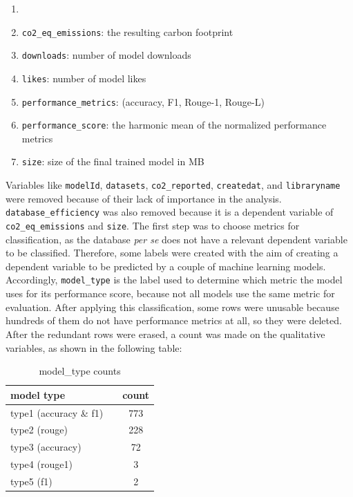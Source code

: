 \documentclass[journal]{IEEEtran}
\begin{document}
	 \begin{enumerate}
	 	\item[]\hspace{-\labelwidth}\hspace{-\labelsep}
	 	\item \texttt{co2\_eq\_emissions}: the resulting carbon footprint
	 	\item \texttt{downloads}: number of model downloads
	 	\item \texttt{likes}: number of model likes
	 	\item \texttt{performance\_metrics}: (accuracy, F1, Rouge-1, Rouge-L)
	 	\item \texttt{performance\_score}: the harmonic mean of the normalized performance metrics
	 	\item \texttt{size}: size of the final trained model in MB
	 \end{enumerate}
	 Variables like \texttt{modelId}, \texttt{datasets}, \texttt{co2\_reported}, \texttt{createdat}, and \texttt{libraryname} were removed because of their lack of importance in the analysis. \texttt{database\_efficiency} was also removed because it is a dependent variable of \texttt{co2\_eq\_emissions} and \texttt{size}.
	 The first step was to choose metrics for classification, as the database \textit{per se} does not have a relevant dependent variable to be classified. Therefore, some labels were created with the aim of creating a dependent variable to be predicted by a couple of machine learning models. Accordingly, \texttt{model\_type} is the label used to determine which metric the model uses for its performance score, because not all models use the same metric for evaluation. After applying this classification, some rows were unusable because hundreds of them do not have performance metrics at all, so they were deleted.
	 After the redundant rows were erased, a count was made on the qualitative variables, as shown in the following table:



	 \begin{table}[H]
	 	\centering
	 	\caption{model\_type counts}
	 	\begin{tabular}{l c }
	 		\toprule
	 		model type & count \\
	 		\midrule
	 		type1 (accuracy \& f1)  & 773 \\
	 		type2 (rouge)           & 228 \\
	 		type3 (accuracy)        & 72 \\
	 		type4 (rouge1)          & 3 \\
	 		type5 (f1)   			& 2 \\
	 		\bottomrule
	 	\end{tabular}
	 	\label{tab:model_type_counts}
	 \end{table}
\end{document}
